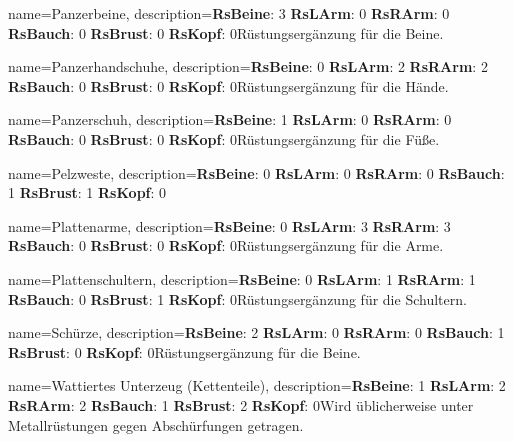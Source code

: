 {
    name={Panzerbeine},
    description={\textbf{RsBeine}: 3 \textbf{RsLArm}: 0 \textbf{RsRArm}: 0 \textbf{RsBauch}: 0 \textbf{RsBrust}: 0 \textbf{RsKopf}: 0\newline Rüstungsergänzung für die Beine.}
}


{
    name={Panzerhandschuhe},
    description={\textbf{RsBeine}: 0 \textbf{RsLArm}: 2 \textbf{RsRArm}: 2 \textbf{RsBauch}: 0 \textbf{RsBrust}: 0 \textbf{RsKopf}: 0\newline Rüstungsergänzung für die Hände.}
}


{
    name={Panzerschuh},
    description={\textbf{RsBeine}: 1 \textbf{RsLArm}: 0 \textbf{RsRArm}: 0 \textbf{RsBauch}: 0 \textbf{RsBrust}: 0 \textbf{RsKopf}: 0\newline Rüstungsergänzung für die Füße.}
}


{
    name={Pelzweste},
    description={\textbf{RsBeine}: 0 \textbf{RsLArm}: 0 \textbf{RsRArm}: 0 \textbf{RsBauch}: 1 \textbf{RsBrust}: 1 \textbf{RsKopf}: 0\newline }
}


{
    name={Plattenarme},
    description={\textbf{RsBeine}: 0 \textbf{RsLArm}: 3 \textbf{RsRArm}: 3 \textbf{RsBauch}: 0 \textbf{RsBrust}: 0 \textbf{RsKopf}: 0\newline Rüstungsergänzung für die Arme.}
}


{
    name={Plattenschultern},
    description={\textbf{RsBeine}: 0 \textbf{RsLArm}: 1 \textbf{RsRArm}: 1 \textbf{RsBauch}: 0 \textbf{RsBrust}: 1 \textbf{RsKopf}: 0\newline Rüstungsergänzung für die Schultern.}
}


{
    name={Schürze},
    description={\textbf{RsBeine}: 2 \textbf{RsLArm}: 0 \textbf{RsRArm}: 0 \textbf{RsBauch}: 1 \textbf{RsBrust}: 0 \textbf{RsKopf}: 0\newline Rüstungsergänzung für die Beine.}
}


{
    name={Wattiertes Unterzeug (Kettenteile)},
    description={\textbf{RsBeine}: 1 \textbf{RsLArm}: 2 \textbf{RsRArm}: 2 \textbf{RsBauch}: 1 \textbf{RsBrust}: 2 \textbf{RsKopf}: 0\newline Wird üblicherweise unter Metallrüstungen gegen Abschürfungen getragen.}
}


